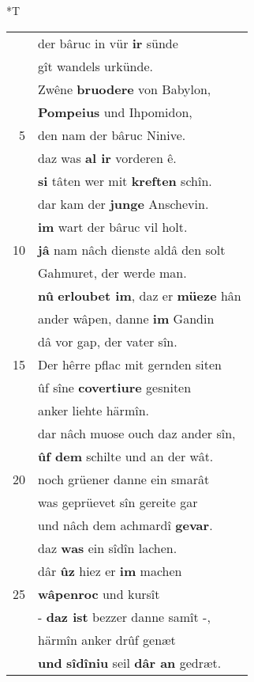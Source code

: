 \documentclass[8pt,a4paper,notitlepage]{article}
\begin{document}
\begin{table}[ht]
\begin{minipage}[t]{0.5\linewidth}
\end{minipage}
\hspace{0.5cm}
\begin{minipage}[t]{0.5\linewidth}
\small
\begin{center}*T
\end{center}
\begin{tabular}{rl}
 & der bâruc in vür \textbf{ir} sünde\\ 
 & gît wandels urkünde.\\ 
 & Zwêne \textbf{bruodere} von Babylon,\\ 
 & \textbf{Pompeius} und Ihpomidon,\\ 
5 & den nam der bâruc Ninive.\\ 
 & daz was \textbf{al ir} vorderen ê.\\ 
 & \textbf{si} tâten wer mit \textbf{kreften} schîn.\\ 
 & dar kam der \textbf{junge} Anschevin.\\ 
 & \textbf{im} wart der bâruc vil holt.\\ 
10 & \textbf{jâ} nam nâch dienste aldâ den solt\\ 
 & Gahmuret, der werde man.\\ 
 & \textbf{nû} \textbf{erloubet im}, daz er \textbf{müeze} hân\\ 
 & ander wâpen, danne \textbf{im} Gandin\\ 
 & dâ vor gap, der vater sîn.\\ 
15 & Der hêrre pflac mit gernden siten\\ 
 & ûf sîne \textbf{covertiure} gesniten\\ 
 & anker liehte härmîn.\\ 
 & dar nâch muose ouch daz ander sîn,\\ 
 & \textbf{ûf dem} schilte und an der wât.\\ 
20 & noch grüener danne ein smarât\\ 
 & was geprüevet sîn gereite gar\\ 
 & und nâch dem achmardî \textbf{gevar}.\\ 
 & daz \textbf{was} ein sîdîn lachen.\\ 
 & dâr \textbf{ûz} hiez er \textbf{im} machen\\ 
25 & \textbf{wâpenroc} und kursît\\ 
 & - \textbf{daz ist} bezzer danne samît -,\\ 
 & härmîn anker drûf genæt\\ 
 & \textbf{und} \textbf{sîdîniu} seil \textbf{dâr an} gedræt.\\ 

\end{tabular}
\end{minipage}
\end{table}
\end{document}
